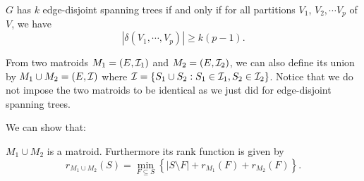 \documentclass[12pt]{article}
\begin{document}
\begin{theorem} \label{kedge}
$G$ has $k$ edge-disjoint spanning trees if and only if for all
  partitions $V_1$, $V_2, \cdots V_p$ of $V$, we have 
$$ |\delta(V_1, \cdots, V_p)|\geq k(p-1).$$
\end{theorem}

From two matroids $M_1=(E, {\cal I}_1)$ and $M_2=(E, {\cal
I}_2)$, we can also define its union by $M_1\cup M_2=(E,{\cal I})$
where ${\cal I}=\{S_1\cup S_2: S_1\in {\cal I}_1, S_2\in {\cal
  I}_2\}$. Notice that we do not impose the two matroids to be
identical as we just did for edge-disjoint spanning trees. 

We can show that:
\begin{theorem} \label{thm:unionmatroid}
$M_1\cup M_2$ is a matroid. Furthermore its rank function is given by 
$$r_{M_1\cup M_2}(S)=\min_{F \subseteq S} \left\{ |S \setminus F| +
  r_{M_1}(F) + r_{M_2} (F) \right\}.$$
\end{theorem}
\end{document}
